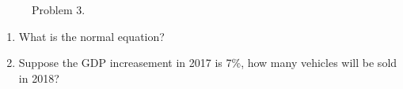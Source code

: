 \documentclass{article}
\begin{document}
\begin{enumerate}
\begin{figure}[!htp]
    	    \caption{Problem 3.}
    	    \label{fig:p4}
    	\end{figure}
    	\begin{enumerate}
    	    \item What is the normal equation?
    	    \item Suppose the GDP increasement in 2017 is 7\%, how many vehicles will be sold in 2018?
    	\end{enumerate}
\end{enumerate}
\end{document}
